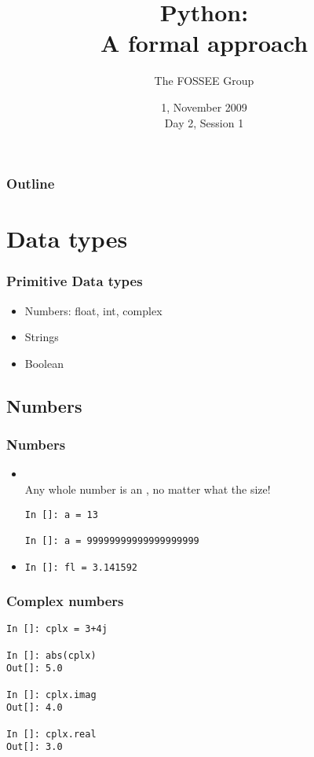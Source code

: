 \documentclass[14pt,compress]{beamer}
\title[Basic Python]{Python:\\A formal approach}
\author[FOSSEE Team] {The FOSSEE Group}
\institute[IIT Bombay] {Department of Aerospace Engineering\\IIT Bombay}
\date[] {1, November 2009\\Day 2, Session 1}
\newcommand{\kwrd}[1]{ \texttt{\textbf{\color{blue}{#1}}}  }
\begin{document}
\begin{frame}
  \titlepage
\end{frame}

\begin{frame}
  \frametitle{Outline}
  \tableofcontents
\end{frame}

\section{Data types}

\begin{frame}
  \frametitle{Primitive Data types}
  \begin{itemize}
    \item Numbers: float, int, complex
    \item Strings
    \item Boolean
  \end{itemize}
\end{frame}

\subsection{Numbers}
\begin{frame}[fragile]
  \frametitle{Numbers}
  \begin{itemize}
    \item \kwrd{int}\\ Any whole number is an \kwrd{int}, no matter what the size!
  \begin{lstlisting}
In []: a = 13

In []: a = 99999999999999999999
  \end{lstlisting}
    \item \kwrd{float}
  \begin{lstlisting}
In []: fl = 3.141592
  \end{lstlisting}
  \end{itemize}
\end{frame}

\begin{frame}[fragile]
\frametitle{Complex numbers}
  \begin{lstlisting}
In []: cplx = 3+4j

In []: abs(cplx)
Out[]: 5.0

In []: cplx.imag
Out[]: 4.0

In []: cplx.real
Out[]: 3.0
  \end{lstlisting}
\end{frame}
\end{document}
